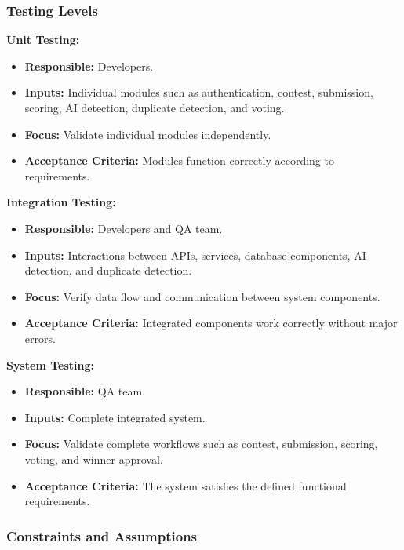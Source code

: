 \subsubsection{Testing Levels}
\label{subsubsec:testing-levels}

\textbf{Unit Testing:}
\begin{itemize}[leftmargin=1.5em, nosep]
    \item \textbf{Responsible:} Developers.
    \item \textbf{Inputs:} Individual modules such as authentication, contest, submission, scoring, AI detection, duplicate detection, and voting.
    \item \textbf{Focus:} Validate individual modules independently.
    \item \textbf{Acceptance Criteria:} Modules function correctly according to requirements.
\end{itemize}

\textbf{Integration Testing:}
\begin{itemize}[leftmargin=1.5em, nosep]
    \item \textbf{Responsible:} Developers and QA team.
    \item \textbf{Inputs:} Interactions between APIs, services, database components, AI detection, and duplicate detection.
    \item \textbf{Focus:} Verify data flow and communication between system components.
    \item \textbf{Acceptance Criteria:} Integrated components work correctly without major errors.
\end{itemize}

\textbf{System Testing:}
\begin{itemize}[leftmargin=1.5em, nosep]
    \item \textbf{Responsible:} QA team.
    \item \textbf{Inputs:} Complete integrated system.
    \item \textbf{Focus:} Validate complete workflows such as contest, submission, scoring, voting, and winner approval.
    \item \textbf{Acceptance Criteria:} The system satisfies the defined functional requirements.
\end{itemize}

\subsubsection{Constraints and Assumptions}
\label{subsubsec:testing-constraints-assumptions}

